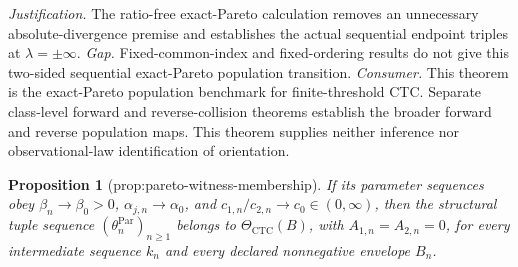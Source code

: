 \documentclass{article}
\newtheorem{proposition}{Proposition}
\begin{document}
\par\smallskip\noindent \textit{Justification.} The ratio-free exact-Pareto calculation removes an unnecessary absolute-divergence premise and establishes the actual sequential endpoint triples at \(\lambda=\pm\infty\). \textit{Gap.} Fixed-common-index and fixed-ordering results do not give this two-sided sequential exact-Pareto population transition. \textit{Consumer.} This theorem is the exact-Pareto population benchmark for finite-threshold CTC. Separate class-level forward and reverse-collision theorems establish the broader forward and reverse population maps. This theorem supplies neither inference nor observational-law identification of orientation.

\begin{proposition}[prop:pareto-witness-membership]\label{prop:pareto-witness-membership}
If its parameter sequences obey \(\beta_n\to\beta_0>0\), \(\alpha_{j,n}\to\alpha_0\), and \(c_{1,n}/c_{2,n}\to c_0\in(0,\infty)\), then the structural tuple sequence \((\theta_n^{\mathrm{Par}})_{n\geq1}\) belongs to \(\Theta_{\mathrm{CTC}}(B)\), with \(A_{1,n}=A_{2,n}=0\), for every intermediate sequence \(k_n\) and every declared nonnegative envelope \(B_n\).
\end{proposition}
\end{document}
